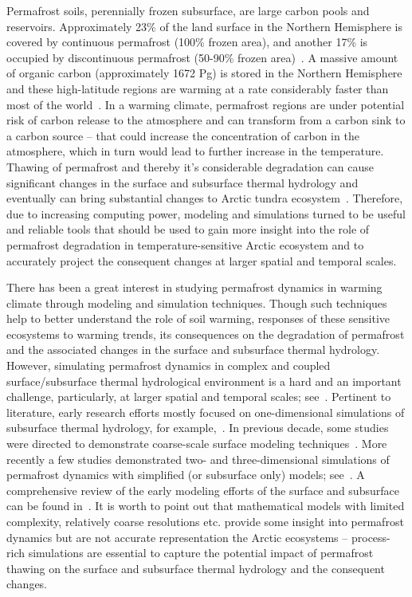 \documentclass[review]{elsarticle}
\begin{document}
Permafrost soils, perennially frozen subsurface, are large carbon pools and reservoirs. Approximately 23\% of the land surface in the Northern Hemisphere is covered by continuous permafrost (100\% frozen area), and another 17\% is occupied by discontinuous permafrost (50-90\% frozen area)~\cite{brown1997circum,jorgenson2001permafrost}. A massive amount of organic carbon (approximately 1672 Pg) is stored in the Northern Hemisphere and these high-latitude regions are warming at a rate considerably faster than most of the world~\cite{tarnocai2009soil, turner2007arctic, hansen1999giss, assessment2004impacts}. In a warming climate, permafrost regions are under potential risk of carbon release to the atmosphere and can transform from a carbon sink to a carbon source -- that could increase the concentration of carbon in the atmosphere, which in turn would lead to further increase in the temperature. Thawing of permafrost and thereby it's considerable degradation can cause significant changes in the surface and subsurface thermal hydrology and eventually can bring substantial changes to Arctic tundra ecosystem~\cite{osterkamp1983response, walvoord2007increased, lyon2009estimation, pachauri2014climate}. Therefore, due to increasing computing power, modeling and simulations turned to be useful and reliable tools that should be used to gain more insight into the role of permafrost degradation in temperature-sensitive Arctic ecosystem and to accurately project the consequent changes at larger spatial and temporal scales.

There has been a great interest in studying permafrost dynamics in warming climate through modeling and simulation techniques. Though such techniques help to better understand the role of soil warming, responses of these sensitive ecosystems to warming trends, its consequences on the degradation of permafrost and the associated changes in the surface and subsurface thermal hydrology. However, simulating permafrost dynamics in complex and coupled surface/subsurface thermal hydrological environment is a hard and an important challenge, particularly, at larger spatial and temporal scales; see~\cite{painter2013modeling}. Pertinent to literature, early research efforts mostly focused on one-dimensional simulations of subsurface thermal hydrology, for example,~\cite{harlan1973analysis, guymon1974coupled, taylor1978model}. In previous decade, some studies were directed to demonstrate coarse-scale surface modeling techniques~\cite{takata2003development, nicolsky2007improved, mckenzie2007groundwater}. More recently a few studies demonstrated two- and three-dimensional simulations of permafrost dynamics with simplified (or subsurface only) models; see~\cite{bense2009evolution, lawrence2012simulation,  koven2013analysis, karra2014three}. A comprehensive review of the early modeling efforts of the surface and subsurface can be found in~\cite{kurylyk2014climate}. It is worth to point out that mathematical models with limited complexity, relatively coarse resolutions etc. provide some insight into permafrost dynamics but are not accurate representation the Arctic ecosystems -- process-rich simulations are essential to capture the potential impact of permafrost thawing on the surface and subsurface thermal hydrology and the consequent changes.
\end{document}
